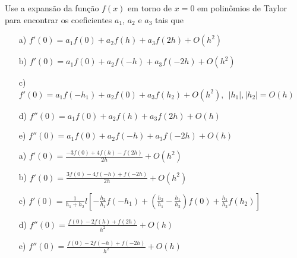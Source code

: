 \begin{Exercise} Use a expansão da função $f(x)$ em torno de $x=0$ em polinômios de Taylor para encontrar os coeficientes $a_1$, $a_2$ e $a_3$ tais que
\begin{itemize}
\item[a)] $f'(0)=a_1f(0)+a_2f(h)+a_3f(2h) + O(h^2)$
\item[b)] $f'(0)=a_1f(0)+a_2f(-h)+a_3f(-2h) + O(h^2)$
\item[c)] $f'(0)=a_1f(-h_1)+a_2f(0)+a_3f(h_2) + O(h^2),~~|h_1|, |h_2|=O(h)$
\item[d)] $f''(0)=a_1f(0)+a_2f(h)+a_3f(2h) + O(h)$
\item[e)] $f''(0)=a_1f(0)+a_2f(-h)+a_3f(-2h) + O(h)$
\end{itemize}
\end{Exercise}
\begin{Answer}
  \begin{tiny}
\begin{itemize}
\item[a)] $f'(0)=\frac{-3f(0)+4f(h)-f(2h)}{2h} + O(h^2)$
\item[b)] $f'(0)=\frac{3f(0)-4f(-h)+f(-2h)}{2h} + O(h^2)$
\item[c)] $f'(0)=\frac{1}{h_1+h_2}l\left[-\frac{h_2}{h_1}f(-h_1) +\left(\frac{h_2}{h_1}-\frac{h_1}{h_2}\right)f(0)+ \frac{h_1}{h_2}f(h_2)\right]$
\item[d)] $f''(0)=\frac{f(0)-2f(h)+f(2h)}{h^2}+O(h)$
\item[e)] $f''(0)=\frac{f(0)-2f(-h)+f(-2h)}{h^2}+O(h)$
\end{itemize}    
  \end{tiny}
\end{Answer}

